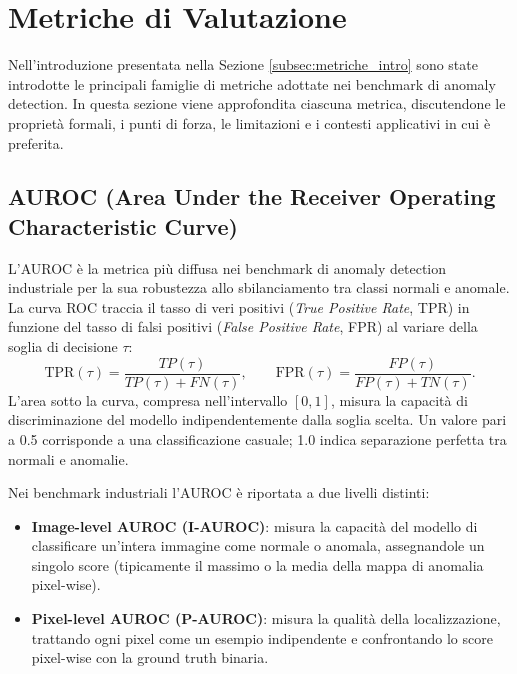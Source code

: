 
\section{Metriche di Valutazione}
\label{sec:metriche}

Nell'introduzione presentata nella Sezione \ref{subsec:metriche_intro} sono state introdotte le principali famiglie di metriche adottate nei benchmark di anomaly detection. In questa sezione viene approfondita ciascuna metrica, discutendone le proprietà formali, i punti di forza, le limitazioni e i contesti applicativi in cui è preferita.

\subsection{AUROC (Area Under the Receiver Operating Characteristic Curve)}
\label{subsec:auroc}

L'AUROC è la metrica più diffusa nei benchmark di anomaly detection industriale per la sua robustezza allo sbilanciamento tra classi normali e anomale. La curva ROC \cite{bergmann2019mvtec} traccia il tasso di veri positivi (\textit{True Positive Rate}, TPR) in funzione del tasso di falsi positivi (\textit{False Positive Rate}, FPR) al variare della soglia di decisione $\tau$:
\[
  \mathrm{TPR}(\tau) = \frac{TP(\tau)}{TP(\tau)+FN(\tau)},
  \qquad
  \mathrm{FPR}(\tau) = \frac{FP(\tau)}{FP(\tau)+TN(\tau)}.
\]
L'area sotto la curva, compresa nell'intervallo $[0,1]$, misura la capacità di discriminazione del modello indipendentemente dalla soglia scelta. Un valore pari a 0.5 corrisponde a una classificazione casuale; 1.0 indica separazione perfetta tra normali e anomalie.

Nei benchmark industriali l'AUROC è riportata a due livelli distinti:

\begin{itemize}
  \item \textbf{Image-level AUROC (I-AUROC)}: misura la capacità del modello di classificare un'intera immagine come normale o anomala, assegnandole un singolo score (tipicamente il massimo o la media della mappa di anomalia pixel-wise).
  \item \textbf{Pixel-level AUROC (P-AUROC)}: misura la qualità della localizzazione, trattando ogni pixel come un esempio indipendente e confrontando lo score pixel-wise con la ground truth binaria.
\end{itemize}


